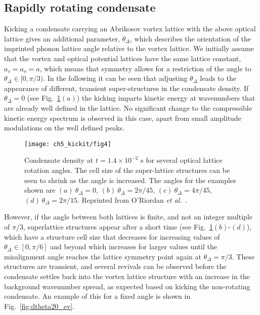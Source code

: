 \subsection{Rapidly rotating condensate}

    Kicking a condensate carrying an Abrikosov vortex lattice with the above optical lattice gives an additional parameter, $\theta_\Delta$, which describes the orientation of the imprinted phonon lattice angle relative to the vortex lattice. We initially assume that the vortex and optical potential lattices have the same lattice constant, $a_v=a_o=a$, which means that symmetry allows for a restriction of the angle to $\theta_\Delta\in[0,\pi/3)$. In the following it can be seen that adjusting $\theta_\Delta$ leads to the appearance of different, transient super-structures in the condensate density. If $\theta_\Delta=0$ (see Fig.~\ref{fig:moire_density}$(a)$) the kicking imparts kinetic energy at wavenumbers that are already well defined in the lattice. No significant change to the compressible kinetic energy spectrum is observed in this case, apart from small amplitude modulations on the well defined peaks.

	\begin{figure}
        \centering
			\texttt{[image: ch5\_kickit/fig4]}
			\caption[Effect of kicking on condensate with a large vortex lattice.]{Condensate density at $t=1.4\times10^{-2}$ s for several optical lattice rotation angles. The cell size of the super-lattice structures can be seen to shrink as the angle is increased. The angles for the examples shown are $(a)~\theta_\Delta=0$, $(b)~\theta_\Delta=2\pi/45$, $(c)~\theta_\Delta=4\pi/45$, $(d)~\theta_\Delta=2\pi/15$. Reprinted from O'Riordan {\textit{et al}.}~\cite{VTX:oriordan_pra_2016}.}
			\label{fig:moire_density}
		\end{figure}

    However, if the angle between both lattices is finite, and not an integer multiple of $\pi/3$, superlattice structures appear after a short time (see Fig.~\ref{fig:moire_density}$(b)$-$(d)$), which have a structure cell size that decreases for increasing values of $\theta_\Delta\in[0,\pi/6]$ and beyond which increases for larger values until the misalignment angle reaches the lattice symmetry point again at $\theta_\Delta=\pi/3$. These structures are transient, and several revivals can be observed before the condensate settles back into the vortex lattice structure with an increase in the background wavenumber spread, as expected based on kicking the non-rotating condensate. An example of this for a fixed angle is shown in Fig.~\ref{fig:dtheta20_ev}.

